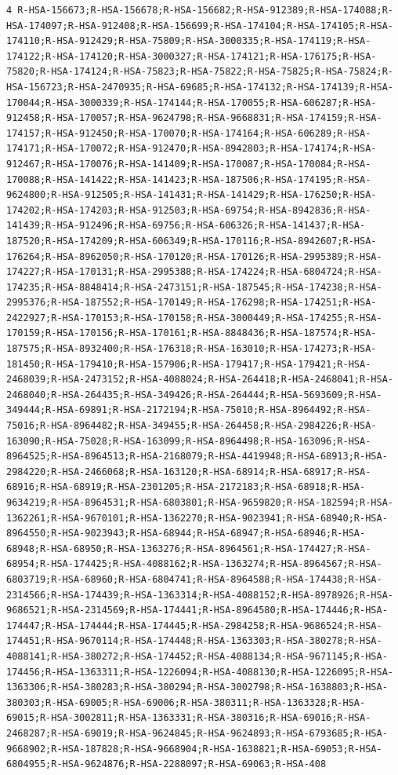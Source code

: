 \documentclass[
  letterpaper,
  DIV=11,
  numbers=noendperiod]{scrartcl}
\begin{document}
\begin{verbatim}
4 R-HSA-156673;R-HSA-156678;R-HSA-156682;R-HSA-912389;R-HSA-174088;R-HSA-174097;R-HSA-912408;R-HSA-156699;R-HSA-174104;R-HSA-174105;R-HSA-174110;R-HSA-912429;R-HSA-75809;R-HSA-3000335;R-HSA-174119;R-HSA-174122;R-HSA-174120;R-HSA-3000327;R-HSA-174121;R-HSA-176175;R-HSA-75820;R-HSA-174124;R-HSA-75823;R-HSA-75822;R-HSA-75825;R-HSA-75824;R-HSA-156723;R-HSA-2470935;R-HSA-69685;R-HSA-174132;R-HSA-174139;R-HSA-170044;R-HSA-3000339;R-HSA-174144;R-HSA-170055;R-HSA-606287;R-HSA-912458;R-HSA-170057;R-HSA-9624798;R-HSA-9668831;R-HSA-174159;R-HSA-174157;R-HSA-912450;R-HSA-170070;R-HSA-174164;R-HSA-606289;R-HSA-174171;R-HSA-170072;R-HSA-912470;R-HSA-8942803;R-HSA-174174;R-HSA-912467;R-HSA-170076;R-HSA-141409;R-HSA-170087;R-HSA-170084;R-HSA-170088;R-HSA-141422;R-HSA-141423;R-HSA-187506;R-HSA-174195;R-HSA-9624800;R-HSA-912505;R-HSA-141431;R-HSA-141429;R-HSA-176250;R-HSA-174202;R-HSA-174203;R-HSA-912503;R-HSA-69754;R-HSA-8942836;R-HSA-141439;R-HSA-912496;R-HSA-69756;R-HSA-606326;R-HSA-141437;R-HSA-187520;R-HSA-174209;R-HSA-606349;R-HSA-170116;R-HSA-8942607;R-HSA-176264;R-HSA-8962050;R-HSA-170120;R-HSA-170126;R-HSA-2995389;R-HSA-174227;R-HSA-170131;R-HSA-2995388;R-HSA-174224;R-HSA-6804724;R-HSA-174235;R-HSA-8848414;R-HSA-2473151;R-HSA-187545;R-HSA-174238;R-HSA-2995376;R-HSA-187552;R-HSA-170149;R-HSA-176298;R-HSA-174251;R-HSA-2422927;R-HSA-170153;R-HSA-170158;R-HSA-3000449;R-HSA-174255;R-HSA-170159;R-HSA-170156;R-HSA-170161;R-HSA-8848436;R-HSA-187574;R-HSA-187575;R-HSA-8932400;R-HSA-176318;R-HSA-163010;R-HSA-174273;R-HSA-181450;R-HSA-179410;R-HSA-157906;R-HSA-179417;R-HSA-179421;R-HSA-2468039;R-HSA-2473152;R-HSA-4088024;R-HSA-264418;R-HSA-2468041;R-HSA-2468040;R-HSA-264435;R-HSA-349426;R-HSA-264444;R-HSA-5693609;R-HSA-349444;R-HSA-69891;R-HSA-2172194;R-HSA-75010;R-HSA-8964492;R-HSA-75016;R-HSA-8964482;R-HSA-349455;R-HSA-264458;R-HSA-2984226;R-HSA-163090;R-HSA-75028;R-HSA-163099;R-HSA-8964498;R-HSA-163096;R-HSA-8964525;R-HSA-8964513;R-HSA-2168079;R-HSA-4419948;R-HSA-68913;R-HSA-2984220;R-HSA-2466068;R-HSA-163120;R-HSA-68914;R-HSA-68917;R-HSA-68916;R-HSA-68919;R-HSA-2301205;R-HSA-2172183;R-HSA-68918;R-HSA-9634219;R-HSA-8964531;R-HSA-6803801;R-HSA-9659820;R-HSA-182594;R-HSA-1362261;R-HSA-9670101;R-HSA-1362270;R-HSA-9023941;R-HSA-68940;R-HSA-8964550;R-HSA-9023943;R-HSA-68944;R-HSA-68947;R-HSA-68946;R-HSA-68948;R-HSA-68950;R-HSA-1363276;R-HSA-8964561;R-HSA-174427;R-HSA-68954;R-HSA-174425;R-HSA-4088162;R-HSA-1363274;R-HSA-8964567;R-HSA-6803719;R-HSA-68960;R-HSA-6804741;R-HSA-8964588;R-HSA-174438;R-HSA-2314566;R-HSA-174439;R-HSA-1363314;R-HSA-4088152;R-HSA-8978926;R-HSA-9686521;R-HSA-2314569;R-HSA-174441;R-HSA-8964580;R-HSA-174446;R-HSA-174447;R-HSA-174444;R-HSA-174445;R-HSA-2984258;R-HSA-9686524;R-HSA-174451;R-HSA-9670114;R-HSA-174448;R-HSA-1363303;R-HSA-380278;R-HSA-4088141;R-HSA-380272;R-HSA-174452;R-HSA-4088134;R-HSA-9671145;R-HSA-174456;R-HSA-1363311;R-HSA-1226094;R-HSA-4088130;R-HSA-1226095;R-HSA-1363306;R-HSA-380283;R-HSA-380294;R-HSA-3002798;R-HSA-1638803;R-HSA-380303;R-HSA-69005;R-HSA-69006;R-HSA-380311;R-HSA-1363328;R-HSA-69015;R-HSA-3002811;R-HSA-1363331;R-HSA-380316;R-HSA-69016;R-HSA-2468287;R-HSA-69019;R-HSA-9624845;R-HSA-9624893;R-HSA-6793685;R-HSA-9668902;R-HSA-187828;R-HSA-9668904;R-HSA-1638821;R-HSA-69053;R-HSA-6804955;R-HSA-9624876;R-HSA-2288097;R-HSA-69063;R-HSA-408
\end{verbatim}
\end{document}
